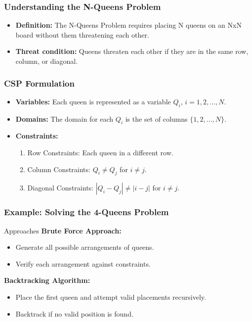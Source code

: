 \documentclass[aspectratio=169]{beamer}
\begin{document}
\begin{frame}[fragile]
    \frametitle{Understanding the N-Queens Problem}
    \begin{itemize}
        \item \textbf{Definition:} The N-Queens Problem requires placing N queens on an NxN board without them threatening each other.
        \item \textbf{Threat condition:} Queens threaten each other if they are in the same row, column, or diagonal.
    \end{itemize}
\end{frame}

\begin{frame}[fragile]
    \frametitle{CSP Formulation}
    \begin{itemize}
        \item \textbf{Variables:} Each queen is represented as a variable \( Q_i \), \( i = 1, 2, \ldots, N \).
        \item \textbf{Domains:} The domain for each \( Q_i \) is the set of columns \( \{1, 2, \ldots, N\} \).
        \item \textbf{Constraints:}
        \begin{enumerate}
            \item Row Constraints: Each queen in a different row.
            \item Column Constraints: \( Q_i \neq Q_j \) for \( i \neq j \).
            \item Diagonal Constraints: \( |Q_i - Q_j| \neq |i - j| \) for \( i \neq j \).
        \end{enumerate}
    \end{itemize}
\end{frame}

\begin{frame}[fragile]
    \frametitle{Example: Solving the 4-Queens Problem}
    \begin{block}{Approaches}
        \textbf{Brute Force Approach:}
        \begin{itemize}
            \item Generate all possible arrangements of queens.
            \item Verify each arrangement against constraints.
        \end{itemize}

        \textbf{Backtracking Algorithm:}
        \begin{itemize}
            \item Place the first queen and attempt valid placements recursively.
            \item Backtrack if no valid position is found.
        \end{itemize}
    \end{block}
\end{frame}
\end{document}
